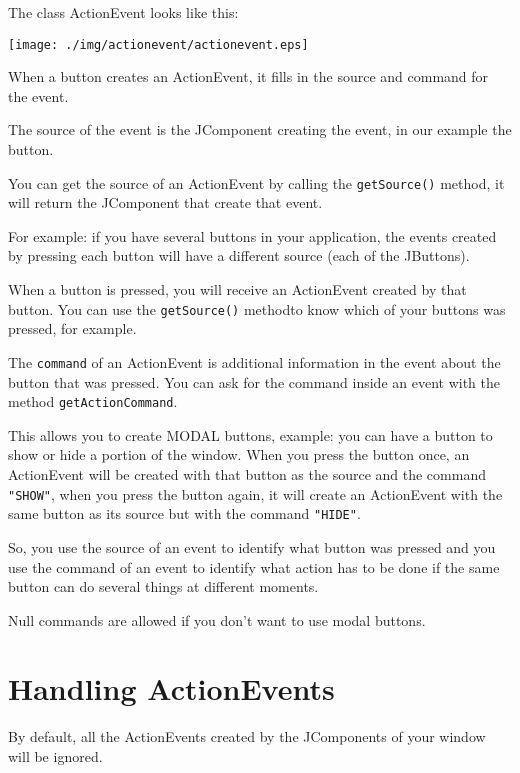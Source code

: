 \documentclass[a4paper, 9pt]{extarticle}
\begin{document}
The class ActionEvent looks like this:

\begin{center}
  \texttt{[image: ./img/actionevent/actionevent.eps]}
\end{center}

When a button creates an ActionEvent, it fills in the source and command for the event.

The source of the event is the JComponent creating the event, in our example the button.

You can get the source of an ActionEvent by calling the \texttt{getSource()}
method, it will return the JComponent that create that event.

For example: if you have several buttons in your application, the events
created by pressing each button will have a different source (each of the
JButtons).

When a button is pressed, you will receive an ActionEvent created by that
button. You can use the \texttt{getSource()} methodto know which of your
buttons was pressed, for example.

The \texttt{command} of an ActionEvent is additional information in the event
about the button that was pressed. You can ask for the command inside an event
with the method \texttt{getActionCommand}.

This allows you to create MODAL buttons, example: you can have a button to show
or hide a portion of the window. When you press the button once, an ActionEvent
will be created with that button as the source and the command \verb+"SHOW"+,
when you press the button again, it will create an ActionEvent with the same
button as its source but with the command \verb+"HIDE"+.

So, you use the source of an event to identify what button was pressed and you
use the command of an event to identify what action has to be done if the same
button can do several things at different moments.

Null commands are allowed if you don't want to use modal buttons.






\section{Handling ActionEvents}

By default, all the ActionEvents created by the JComponents of your window will be ignored.
\end{document}
